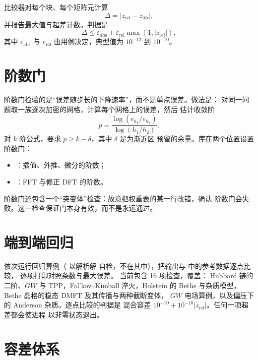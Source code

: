 比较器对每个块、每个矩阵元计算
\begin{equation}
    \Delta = |z_{\mathrm{ref}} - z_{\mathrm{lib}}|,
\end{equation}
并报告最大值与超差计数。判据是
\begin{equation}
    \Delta \le \varepsilon_{\mathrm{abs}}
    + \varepsilon_{\mathrm{rel}}\max(1,|z_{\mathrm{ref}}|),
\end{equation}
其中 $\varepsilon_{\mathrm{abs}}$ 与 $\varepsilon_{\mathrm{rel}}$
由用例决定，典型值为 $10^{-12}$ 到 $10^{-10}$。

\section{阶数门}
\label{sec:order-gates}

阶数门检验的是“误差随步长的下降速率”，而不是单点误差。做法是：
对同一问题取一族逐次加密的网格，计算每个网格上的误差，然后
估计收敛阶
\begin{equation}
    p = \frac{\log(e_{h_1}/e_{h_2})}{\log(h_1/h_2)} .
\end{equation}
对 $k$ 阶公式，要求 $p\ge k-\delta$，其中 $\delta$ 是为渐近区
预留的余量。库在两个位置设置阶数门：
\begin{itemize}
    \item {}：插值、外推、微分的阶数；
    \item {}：FFT 与修正 DFT 的阶数。
\end{itemize}

阶数门还包含一个“突变体”检查：故意把权重表的某一行改错，确认
阶数门会失败。这一检查保证门本身有效，而不是永远通过。

\section{端到端回归}
\label{sec:validate-driver}

 依次运行回归算例（ 以解析解
自检，不在其中），把输出与  中的参考数据逐点比较，
逐项打印对照条数与最大误差。
当前包含 16 项检查，覆盖：
Hubbard 链的二阶、$GW$ 与 TPP，Fal'kov--Kimball 淬火，Holstein 的
Bethe 与杂质模型，Bethe 晶格的稳态 DMFT 及其传播与两种截断变体，
$GW$ 电场算例，以及偏压下的 Anderson 杂质。逐点比较的判据是
混合容差 $10^{-10}+10^{-10}|z_{\mathrm{ref}}|$。任何一项超差都会使进程
以非零状态退出。

\section{容差体系}
\label{sec:tolerances}

